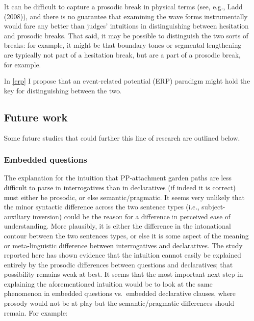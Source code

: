 \documentclass[12pt,oneside]{book}
\begin{document}
It can be difficult to capture a prosodic break in physical terms (see, e.g., Ladd (2008)), and there is no guarantee that examining the wave forms instrumentally would fare any better than judges' intuitions in distinguishing between hesitation and prosodic breaks. That said, it may be possible to distinguish the two sorts of breaks: for example, it might be that boundary tones or segmental lengthening are typically not part of a hesitation break, but are a part of a prosodic break, for example.

In \ref{erp} I propose that an event-related potential (ERP) paradigm might hold the key for distinguishing between the two.

\hypertarget{future-work}{%
\subsection{Future work}\label{future-work}}

Some future studies that could further this line of research are outlined below.

\hypertarget{embedded-questions}{%
\subsubsection{Embedded questions}\label{embedded-questions}}

The explanation for the intuition that PP-attachment garden paths are less difficult to parse in interrogatives than in declaratives (if indeed it is correct) must either be prosodic, or else semantic/pragmatic. It seems very unlikely that the minor syntactic difference across the two sentence types (i.e., subject-auxiliary inversion) could be the reason for a difference in perceived ease of understanding. More plausibly, it is either the difference in the intonational contour between the two sentences types, or else it is some aspect of the meaning or meta-linguistic difference between interrogatives and declaratives. The study reported here has shown evidence that the intuition cannot easily be explained entirely by the prosodic differences between questions and declaratives; that possibility remains weak at best. It seems that the most important next step in explaining the aforementioned intuition would be to look at the same phenomenon in embedded questions vs.~embedded declarative clauses, where prosody would not be at play but the semantic/pragmatic differences should remain. For example:
\end{document}
